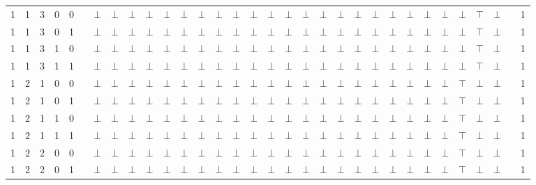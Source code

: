 \documentclass[12pt]{extarticle}
\begin{document}
\begin{landscape}
\begin{tiny}
\begin{longtable}[c]{llllllllllllllllllllllllllllllll}
1 & 1 & 3 & 0 & 0 &  & $\bot$ & $\bot$ & $\bot$ & $\bot$ & $\bot$ & $\bot$ & $\bot$ & $\bot$ & $\bot$ & $\bot$ & $\bot$ & $\bot$ & $\bot$ & $\bot$ & $\bot$ & $\bot$ & $\bot$ & $\bot$ & $\bot$ & $\bot$ & $\bot$ & $\bot$ & $\top$ & $\bot$ &  & 1 \\
1 & 1 & 3 & 0 & 1 &  & $\bot$ & $\bot$ & $\bot$ & $\bot$ & $\bot$ & $\bot$ & $\bot$ & $\bot$ & $\bot$ & $\bot$ & $\bot$ & $\bot$ & $\bot$ & $\bot$ & $\bot$ & $\bot$ & $\bot$ & $\bot$ & $\bot$ & $\bot$ & $\bot$ & $\bot$ & $\top$ & $\bot$ &  & 1 \\
1 & 1 & 3 & 1 & 0 &  & $\bot$ & $\bot$ & $\bot$ & $\bot$ & $\bot$ & $\bot$ & $\bot$ & $\bot$ & $\bot$ & $\bot$ & $\bot$ & $\bot$ & $\bot$ & $\bot$ & $\bot$ & $\bot$ & $\bot$ & $\bot$ & $\bot$ & $\bot$ & $\bot$ & $\bot$ & $\top$ & $\bot$ &  & 1 \\
1 & 1 & 3 & 1 & 1 &  & $\bot$ & $\bot$ & $\bot$ & $\bot$ & $\bot$ & $\bot$ & $\bot$ & $\bot$ & $\bot$ & $\bot$ & $\bot$ & $\bot$ & $\bot$ & $\bot$ & $\bot$ & $\bot$ & $\bot$ & $\bot$ & $\bot$ & $\bot$ & $\bot$ & $\bot$ & $\top$ & $\bot$ &  & 1 \\
1 & 2 & 1 & 0 & 0 &  & $\bot$ & $\bot$ & $\bot$ & $\bot$ & $\bot$ & $\bot$ & $\bot$ & $\bot$ & $\bot$ & $\bot$ & $\bot$ & $\bot$ & $\bot$ & $\bot$ & $\bot$ & $\bot$ & $\bot$ & $\bot$ & $\bot$ & $\bot$ & $\bot$ & $\top$ & $\bot$ & $\bot$ &  & 1 \\
1 & 2 & 1 & 0 & 1 &  & $\bot$ & $\bot$ & $\bot$ & $\bot$ & $\bot$ & $\bot$ & $\bot$ & $\bot$ & $\bot$ & $\bot$ & $\bot$ & $\bot$ & $\bot$ & $\bot$ & $\bot$ & $\bot$ & $\bot$ & $\bot$ & $\bot$ & $\bot$ & $\bot$ & $\top$ & $\bot$ & $\bot$ &  & 1 \\
1 & 2 & 1 & 1 & 0 &  & $\bot$ & $\bot$ & $\bot$ & $\bot$ & $\bot$ & $\bot$ & $\bot$ & $\bot$ & $\bot$ & $\bot$ & $\bot$ & $\bot$ & $\bot$ & $\bot$ & $\bot$ & $\bot$ & $\bot$ & $\bot$ & $\bot$ & $\bot$ & $\bot$ & $\top$ & $\bot$ & $\bot$ &  & 1 \\
1 & 2 & 1 & 1 & 1 &  & $\bot$ & $\bot$ & $\bot$ & $\bot$ & $\bot$ & $\bot$ & $\bot$ & $\bot$ & $\bot$ & $\bot$ & $\bot$ & $\bot$ & $\bot$ & $\bot$ & $\bot$ & $\bot$ & $\bot$ & $\bot$ & $\bot$ & $\bot$ & $\bot$ & $\top$ & $\bot$ & $\bot$ &  & 1 \\
1 & 2 & 2 & 0 & 0 &  & $\bot$ & $\bot$ & $\bot$ & $\bot$ & $\bot$ & $\bot$ & $\bot$ & $\bot$ & $\bot$ & $\bot$ & $\bot$ & $\bot$ & $\bot$ & $\bot$ & $\bot$ & $\bot$ & $\bot$ & $\bot$ & $\bot$ & $\bot$ & $\bot$ & $\top$ & $\bot$ & $\bot$ &  & 1 \\
1 & 2 & 2 & 0 & 1 &  & $\bot$ & $\bot$ & $\bot$ & $\bot$ & $\bot$ & $\bot$ & $\bot$ & $\bot$ & $\bot$ & $\bot$ & $\bot$ & $\bot$ & $\bot$ & $\bot$ & $\bot$ & $\bot$ & $\bot$ & $\bot$ & $\bot$ & $\bot$ & $\bot$ & $\top$ & $\bot$ & $\bot$ &  & 1 \\

\end{longtable}
\end{tiny}
\end{landscape}
\end{document}
